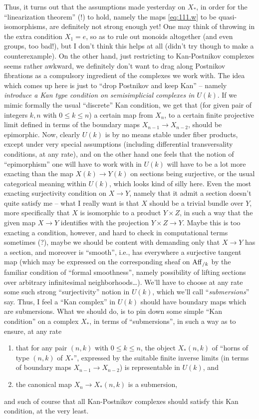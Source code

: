 Thus, it turns out that the assumptions made yesterday on $X_*$, in
order for the ``linearization theorem'' (!) to hold, namely the maps
\eqref{eq:111.w} to be quasi-isomorphisms, are definitely not strong
enough yet! One may think of throwing in the extra condition $X_1=e$,
so as to rule out monoids altogether (and even groups, too bad!), but
I don't think this helps at all (didn't try though to make a
counterexample). On the other hand, just restricting to Kan-Postnikov
complexes seems rather awkward, we definitely don't want to drag along
Postnikov fibrations as a compulsory ingredient of the complexes we
work with. The idea which comes up here is just to ``drop Postnikov
and keep Kan'' -- namely \emph{introduce a Kan type condition on
  semisimplicial complexes in $U(k)$}. If we mimic
formally the usual ``discrete'' Kan condition, we get that (for given
pair of integers $k,n$ with $0\le k\le n$) a certain map from $X_n$,
to a certain finite projective limit defined in terms of the boundary
maps $X_{n-1}\to X_{n-2}$, should be epimorphic. Now, clearly $U(k)$
is by no means stable under fiber products, except under very special
assumptions (including differential transversality conditions, at any
rate), and on the other hand one feels that the notion of
``epimorphism'' one will have to work with in $U(k)$ will have to be a
lot more exacting than the map $X(k)\to Y(k)$ on sections being
surjective, or the usual categorical meaning within $U(k)$, which
looks kind of silly here. Even the most exacting surjectivity
condition on $X\to Y$, namely that it admit a section doesn't quite
satisfy me -- what I really want is that $X$ should be a trivial
bundle over $Y$, more specifically that $X$ is isomorphic to a product
$Y\times Z$, in such a way that the given map $X\to Y$ identifies with
the projection $Y\times Z\to Y$. Maybe this is too exacting a
condition, however, and hard to check in computational terms sometimes
(?), maybe we should be content with demanding only that $X\to Y$ has
a section, and moreover is ``smooth'', i.e., has everywhere a
surjective tangent map (which may be expressed on the corresponding
sheaf on $\operatorname{Aff}_{/k}$ by the familiar condition of ``formal
smoothness'', namely possibility of lifting sections over arbitrary
infinitesimal neighborhoods\dots). We'll have to choose at any rate
some such strong ``surjectivity'' notion in $U(k)$, which we'll call
``\emph{submersions}'' say. Thus, I feel a ``Kan complex'' in $U(k)$
should have boundary maps which are submersions. What we should do, is
to pin down some simple ``Kan condition'' on a complex $X_*$, in terms
of ``submersions'', in such a way as to ensure, at any rate
\begin{enumerate}[label=\alph*)]
\item\label{it:112.a}
  that for any pair $(n,k)$ with $0\le k\le n$, the object $X_*(n,k)$
  of ``horns of type $(n,k)$ of $X_*$'', expressed by the suitable
  finite inverse limits (in terms of boundary maps $X_{n-1}\to
  X_{n-2}$) is representable in $U(k)$, and
\item\label{it:112.b}
  the canonical map $X_n\to X_*(n,k)$ is a submersion,
\end{enumerate}
and such of course that all Kan-Postnikov complexes should satisfy
this Kan condition, at the very least.

